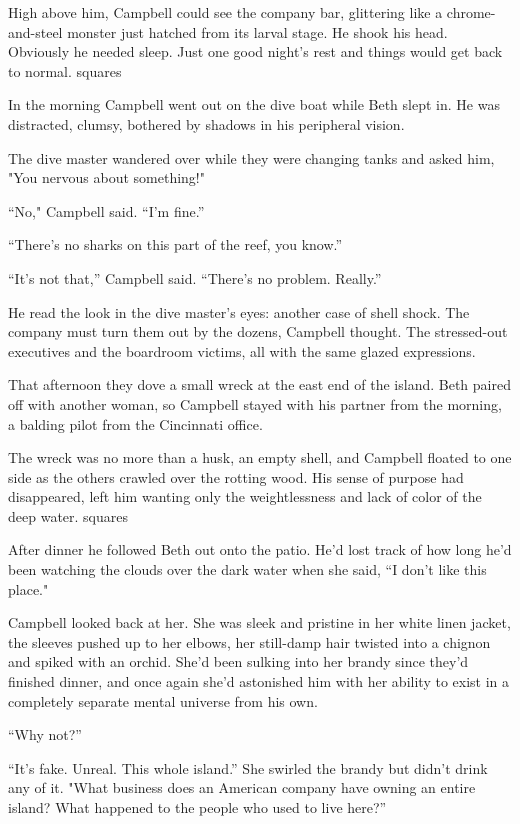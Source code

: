 High above him, Campbell could see the company bar, glittering like a chrome-and-steel monster just hatched from its larval stage. He shook his head. Obviously he needed sleep. Just one good night's rest and things would get back to normal.
squares

In the morning Campbell went out on the dive boat while Beth slept in. He was distracted, clumsy, bothered by shadows in his peripheral vision.

The dive master wandered over while they were changing tanks and asked him, "You nervous about something!"

``No," Campbell said. ``I'm fine.''

``There's no sharks on this part of the reef, you know.''

``It's not that,'' Campbell said. ``There's no problem. Really.''

He read the look in the dive master's eyes: another case of shell shock. The company must turn them out by the dozens, Campbell thought. The stressed-out executives and the boardroom victims, all with the same glazed expressions.

That afternoon they dove a small wreck at the east end of the island. Beth paired off with another woman, so Campbell stayed with his partner from the morning, a balding pilot from the Cincinnati office.

The wreck was no more than a husk, an empty shell, and Campbell floated to one side as the others crawled over the rotting wood. His sense of purpose had disappeared, left him wanting only the weightlessness and lack of color of the deep water.
squares

After dinner he followed Beth out onto the patio. He'd lost track of how long he'd been watching the clouds over the dark water when she said, ``I don't like this place."

Campbell looked back at her. She was sleek and pristine in her white linen jacket, the sleeves pushed up to her elbows, her still-damp hair twisted into a chignon and spiked with an orchid. She'd been sulking into her brandy since they'd finished dinner, and once again she'd astonished him with her ability to exist in a completely separate mental universe from his own.

``Why not?''

``It's fake. Unreal. This whole island.'' She swirled the brandy but didn't drink any of it. "What business does an American company have owning an entire island? What happened to the people who used to live here?''

